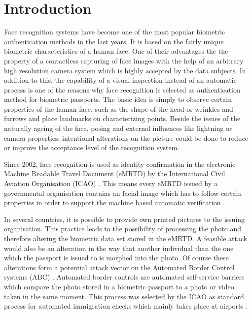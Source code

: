 \section{Introduction}
Face recognition systems have become one of the most popular biometric authentication methods in the last years. It is based on the fairly unique biometric characteristics of a human face. One of their advantages the the property of a contactless capturing of face images with the help of an arbitrary high resolution camera system which is highly accepted by the data subjects. In addition to this, the capability of a visual inspection instead of an automatic process is one of the reasons why face recognition is selected as authentication method for biometric passports. 
The basic idea is simply to observe certain properties of the human face, such as the shape of the head or wrinkles and furrows and place landmarks on characterizing points. 
Beside the issues of the naturally ageing of the face, posing and external influences like lightning or camera properties, intentional alterations on the picture could be done to reduce or improve the acceptance level of the recognition system.

Since 2002, face recognition is used as identity confirmation in the electronic Machine Readable Travel Document (eMRTD) by the  International Civil Aviation Organisation (ICAO) \cite{del2016automated}. This means every eMRTD issued by a governmental organisation contains an facial image which has to follow certain properties in order to support the machine based automatic verification \cite{bdi2010Verordnung}. 

In several countries, it is possible to provide own printed pictures to the issuing organisation. This practice leads to the possibility of processing the photo and therefore altering the biometric data set stored in the eMRTD. A feasible attack would also be an alteration in the way that another individual than the one which the passport is issued to is morphed into the photo. Of course these alterations form a potential attack vector on the Automated Border Control systems (ABC) . Automated border controls are automated self-service barriers which compare the  photo stored in a biometric passport to a photo or video taken in the same moment. This process was selected by the ICAO as standard process for automated immigration checks which mainly takes place at airports \cite{del2016automated}. 

